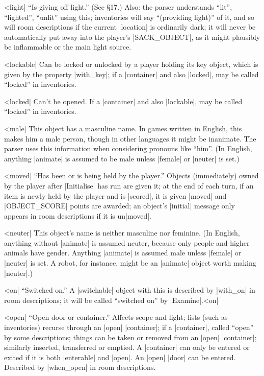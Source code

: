 ^^|light|
``Is giving off light.''  (See \S 17.)  Also: the parser understands
``lit'', ``lighted'', ``unlit'' using this; inventories will
say ``(providing light)'' of it, and so will room descriptions if the
current |location| is ordinarily dark; it will never be automatically
put away into the player's |SACK_OBJECT|, as it might plausibly be
inflammable or the main light source.

^^|lockable|
Can be locked or unlocked by a player
holding its key object, which is given by the property |with_key|;
if a |container| and also |locked|, may be called ``locked'' in
inventories.

^^|locked|
Can't be opened.   If a |container|
and also |lockable|, may be called ``locked'' in inventories.

^^|male|
This object has a masculine name.  In games written in English,
this makes him a male person, though in other languages it might
be inanimate.  The parser uses this information when considering
pronouns like ``him''.  (In English, anything |animate| is assumed
to be male unless |female| or |neuter| is set.)

^^|moved|
``Has been or is being held by the player.''  Objects
(immediately) owned by the player after |Initialise| has run are given
it; at the end of each turn, if an item is newly held by the player
and is |scored|, it is given |moved| and |OBJECT_SCORE| points are
awarded; an object's |initial| message only appears in room
descriptions if it is un|moved|.

^^|neuter|
This object's name is neither masculine nor feminine.  (In English,
anything without |animate| is assumed neuter, because only people and
higher animals have gender.  Anything |animate| is assumed male
unless |female| or |neuter| is set.  A robot, for instance, might be
an |animate| object worth making |neuter|.)

^^|on|
``Switched on.''  A |switchable| object with this
is described by |with_on| in room descriptions; it will be called
``switched on'' by |Examine|.^^|on|\

^^|open|
``Open door or container.''  Affects scope and light; lists (such as
inventories) recurse through an |open| |container|; if a |container|, called
``open'' by some descriptions; things can be taken or removed from an |open|
|container|; similarly inserted, transferred or emptied.  A |container| can
only be entered or exited if it is both |enterable| and |open|.  An |open|
|door| can be entered.  Described by |when_open| in room descriptions.

